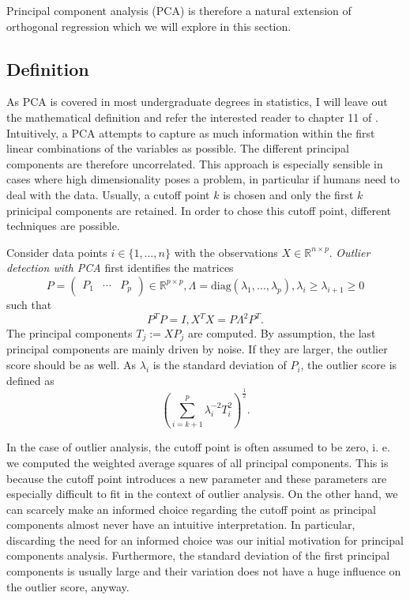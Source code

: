 \documentclass[]{report}
\theoremstyle{definition}
\theoremstyle{definition}
\theoremstyle{definition}
\theoremstyle{remark}
\let\BeginKnitrBlock\begin \let\EndKnitrBlock\end
\begin{document}
Principal component analysis (PCA) is therefore a natural extension of
orthogonal regression which we will explore in this section.

\hypertarget{definition}{%
\subsection{Definition}\label{definition}}

As PCA is covered in most undergraduate degrees in statistics, I will
leave out the mathematical definition and refer the interested reader to
chapter 11 of \citet{Hardle2015}. Intuitively, a PCA attempts to capture
as much information within the first linear combinations of the
variables as possible. The different principal components are therefore
uncorrelated. This approach is especially sensible in cases where high
dimensionality poses a problem, in particular if humans need to deal
with the data. Usually, a cutoff point \(k\) is chosen and only the
first \(k\) prinicipal components are retained. In order to chose this
cutoff point, different techniques are possible.

\BeginKnitrBlock{definition}
\protect\hypertarget{def:unnamed-chunk-6}{}{\label{def:unnamed-chunk-6}
}Consider data points \(i\in\{1,\dotsc,n\}\) with the observations
\(X\in\mathbb{R}^{n\times p}\). \emph{Outlier detection with PCA} first
identifies the matrices \[
  P=\begin{pmatrix}P_1&\dotsb&P_p\end{pmatrix}\in\mathbb{R}^{p\times p},\Lambda = \text{diag}(\lambda_1,\dotsc,\lambda_p),\lambda_i\ge\lambda_{i+1}\ge0
\] such that \[
  P^TP=I, X^TX=P\Lambda^2P^T.
\] The principal components \(T_j:=XP_j\) are computed. By assumption,
the last principal components are mainly driven by noise. If they are
larger, the outlier score should be as well. As \(\lambda_i\) is the
standard deviation of \(P_i\), the outlier score is defined as \[
  \left(\sum_{i=k+1}^p\lambda_i^{-2}T_i^2\right)^{\frac{1}{2}}.
\]
\EndKnitrBlock{definition}

In the case of outlier analysis, the cutoff point is often assumed to be
zero, i. e. we computed the weighted average squares of all principal
components. This is because the cutoff point introduces a new parameter
and these parameters are especially difficult to fit in the context of
outlier analysis. On the other hand, we can scarcely make an informed
choice regarding the cutoff point as principal components almost never
have an intuitive interpretation. In particular, discarding the need for
an informed choice was our initial motivation for principal components
analysis. Furthermore, the standard deviation of the first principal
components is usually large and their variation does not have a huge
influence on the outlier score, anyway.
\end{document}
